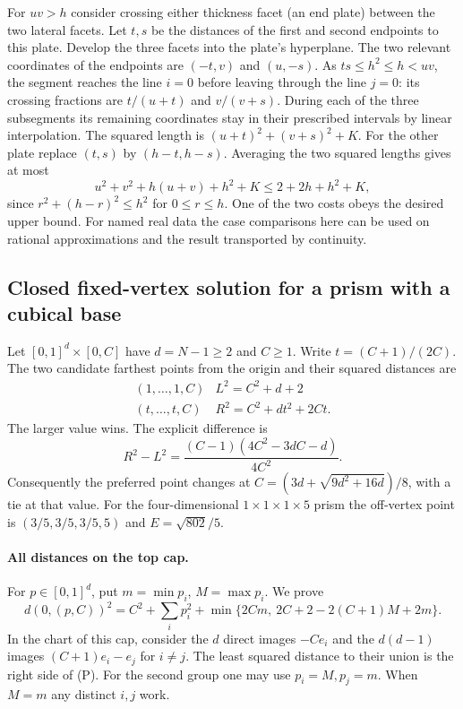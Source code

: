 \documentclass[10pt,letterpaper]{article}
\begin{document}
For $uv>h$ consider crossing either thickness facet (an end plate)
between the two lateral facets. Let $t,s$ be the distances of the
first and second endpoints to this plate. Develop the three facets
into the plate's hyperplane. The two relevant coordinates of the
endpoints are $(-t,v)$ and $(u,-s)$. As $ts\le h^2\le h<uv$,
the segment reaches the line $i=0$ before leaving through the line
$j=0$: its crossing fractions are $t/(u+t)$ and $v/(v+s)$.
During each of the three subsegments its remaining coordinates
stay in their prescribed intervals by linear interpolation. The
squared length is $(u+t)^2+(v+s)^2+K$.
For the other plate replace $(t,s)$ by $(h-t,h-s)$. Averaging the
two squared lengths gives at most
\[
 u^2+v^2+h(u+v)+h^2+K\le 2+2h+h^2+K,
\]
since $r^2+(h-r)^2\le h^2$ for $0\le r\le h$. One of the two
costs obeys the desired upper bound. For named real data the case
comparisons here can be used on rational approximations and the
result transported by continuity.


\subsection{Closed fixed-vertex solution for a prism with a cubical base}
\label{sec:prismfixed}
Let $[0,1]^d\times[0,C]$ have $d=N-1\ge2$ and $C\ge1$.
Write $t=(C+1)/(2C)$. The two candidate farthest points from the
origin and their squared distances are
\[
 \begin{array}{c|c}
   (1,\ldots,1,C)& L^2=C^2+d+2\\
   (t,\ldots,t,C)& R^2=C^2+d t^2+2Ct .
 \end{array}
\]
The larger value wins. The explicit difference is
\[
 R^2-L^2=\frac{(C-1)(4C^2-3dC-d)}{4C^2}.
\]
Consequently the preferred point changes at
$C=(3d+\sqrt{9d^2+16d})/8$, with a tie at that value.
For the four-dimensional $1\times1\times1\times5$ prism the off-vertex
point is $(3/5,3/5,3/5,5)$ and $E=\sqrt{802}/5$.

\paragraph{All distances on the top cap.}
For $p\in[0,1]^d$, put $m=\min p_i$, $M=\max p_i$. We prove
\[
 d(0,(p,C))^2=C^2+\sum_i p_i^2+
       \min\{2Cm,\ 2C+2-2(C+1)M+2m\}.                 \tag{P}
\]
In the chart of this cap, consider the $d$ direct images $-C e_i$
and the $d(d-1)$ images $(C+1)e_i-e_j$ for $i\ne j$.
The least squared distance to their union is the right side of (P).
For the second group one may use $p_i=M,p_j=m$. When
$M=m$ any distinct $i,j$ work.
\end{document}
